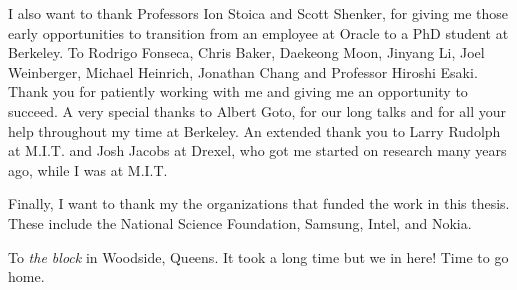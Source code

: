 \documentclass{ucbthesis}
\begin{document}
\begin{frontmatter}
\begin{acknowledgements}
I also want to thank Professors Ion Stoica and Scott Shenker, for giving me those early opportunities to transition from an employee
at Oracle to a PhD student at Berkeley. To Rodrigo Fonseca, Chris Baker, Daekeong Moon, Jinyang Li, Joel Weinberger,
Michael Heinrich, Jonathan Chang and
Professor Hiroshi Esaki.  Thank you for patiently working with me and giving me an opportunity to succeed.  
A very special thanks to Albert Goto, for our long talks and for all your help throughout my time at Berkeley.  
An extended
thank you to Larry Rudolph at M.I.T. and Josh Jacobs at Drexel, who got me started on research many years ago, while I was at M.I.T.

Finally, I want to thank my the organizations that funded the work in this thesis.  These include the National Science Foundation,
Samsung, Intel, and Nokia.

To \emph{the block} in Woodside, Queens.  
It took a long time but we in here!  Time to go home.








\end{acknowledgements}

\end{frontmatter}

\pagestyle{headings}




















\appendix


\printbibliography
\end{document}
